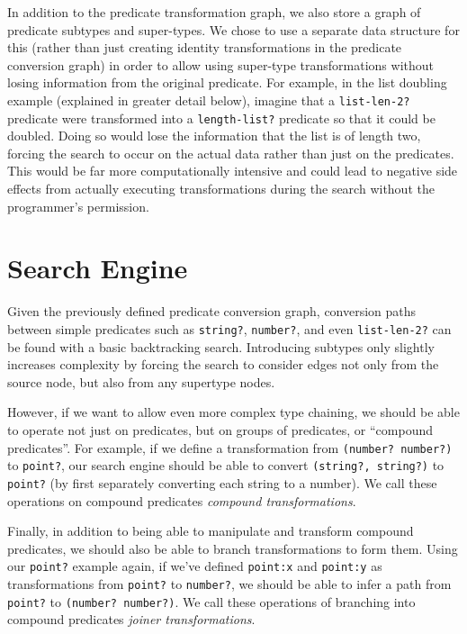 \documentclass[letterpaper]{article}
\begin{document}
In addition to the predicate transformation graph, we also store a graph of predicate subtypes and super-types.  We chose to use a separate data structure for this (rather than just creating identity transformations in the predicate conversion graph) in order to allow using super-type transformations without losing information from the original predicate.  For example, in the list doubling example (explained in greater detail below), imagine that a \texttt{list-len-2?} predicate were transformed into a \texttt{length-list?} predicate so that it could be doubled.  Doing so would lose the information that the list is of length two, forcing the search to occur on the actual data rather than just on the predicates.  This would be far more computationally intensive and could lead to negative side effects from actually executing transformations during the search without the programmer's permission. 

\section{Search Engine}

Given the previously defined predicate conversion graph, conversion paths between simple predicates such as \texttt{string?}, \texttt{number?}, and even \texttt{list-len-2?} can be found with a basic backtracking search.  Introducing subtypes only slightly increases complexity by forcing the search to consider edges not only from the source node, but also from any supertype nodes.

However, if we want to allow even more complex type chaining, we should be able to operate not just on predicates, but on groups of predicates, or ``compound predicates''.  For example, if we define a transformation from \texttt{(number? number?)} to \texttt{point?}, our search engine should be able to convert \texttt{(string?, string?)} to \texttt{point?} (by first separately converting each string to a number).  We call these operations on compound predicates \textit{compound transformations}.

Finally, in addition to being able to manipulate and transform compound predicates, we should also be able to branch transformations to form them.  Using our \texttt{point?} example again, if we've defined \texttt{point:x} and \texttt{point:y} as transformations from \texttt{point?} to \texttt{number?}, we should be able to infer a path from \texttt{point?} to \texttt{(number? number?)}.  We call these operations of branching into compound predicates \textit{joiner transformations}.
\end{document}
